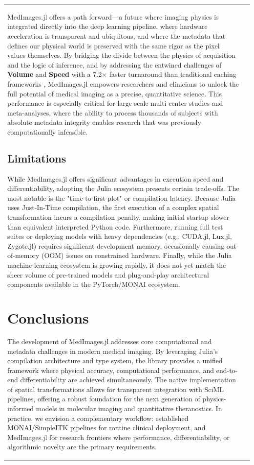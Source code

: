 \documentclass[10pt,letterpaper]{article}
\begin{document}
\begin{table}[H]
\begin{tabular}{|p{}|p{}|}
MedImages.jl offers a path forward---a future where imaging physics is integrated directly into the deep learning pipeline, where hardware acceleration is transparent and ubiquitous, and where the metadata that defines our physical world is preserved with the same rigor as the pixel values themselves. By bridging the divide between the physics of acquisition and the logic of inference, and by addressing the entwined challenges of \textbf{Volume} and \textbf{Speed} with a 7.2$\times$ faster turnaround than traditional caching frameworks \cite{Shi_2023}, MedImages.jl empowers researchers and clinicians to unlock the full potential of medical imaging as a precise, quantitative science. This performance is especially critical for large-scale multi-center studies and meta-analyses, where the ability to process thousands of subjects with absolute metadata integrity enables research that was previously computationally infeasible.


\subsection*{Limitations}
While MedImages.jl offers significant advantages in execution speed and differentiability, adopting the Julia ecosystem presents certain trade-offs. The most notable is the "time-to-first-plot" or compilation latency. Because Julia uses Just-In-Time compilation, the first execution of a complex spatial transformation incurs a compilation penalty, making initial startup slower than equivalent interpreted Python code. Furthermore, running full test suites or deploying models with heavy dependencies (e.g., CUDA.jl, Lux.jl, Zygote.jl) requires significant development memory, occasionally causing out-of-memory (OOM) issues on constrained hardware. Finally, while the Julia machine learning ecosystem is growing rapidly, it does not yet match the sheer volume of pre-trained models and plug-and-play architectural components available in the PyTorch/MONAI ecosystem.

\section{Conclusions}
The development of MedImages.jl addresses core computational and metadata challenges in modern medical imaging. By leveraging Julia's compilation architecture and type system, the library provides a unified framework where physical accuracy, computational performance, and end-to-end differentiability are achieved simultaneously. The native implementation of spatial transformations allows for transparent integration with SciML pipelines, offering a robust foundation for the next generation of physics-informed models in molecular imaging and quantitative theranostics.
In practice, we envision a complementary workflow: established MONAI/SimpleITK pipelines for routine clinical deployment, and MedImages.jl for research frontiers where performance, differentiability, or algorithmic novelty are the primary requirements.


\end{tabular}
\end{table}
\end{document}
